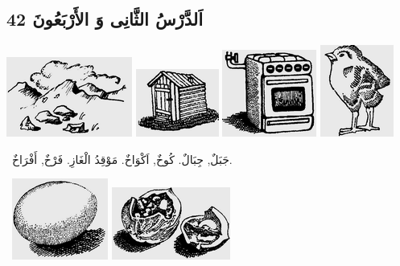 \documentclass[a5paper]{article}
\begin{document}
\subsection{اَلدَّرْسُ الثَّانِى وَ الأَرْبَعُونَ 42}
 \includegraphics[width=1.6252in,height=1.0311in]{images/MuhammadBagauddinprettified-img125.png}   \includegraphics[width=1.0728in,height=0.8752in]{images/MuhammadBagauddinprettified-img126.png}   \includegraphics[width=1.2189in,height=1.1252in]{images/MuhammadBagauddinprettified-img127.png}   \includegraphics[width=0.948in,height=1.1874in]{images/MuhammadBagauddinprettified-img128.png} 

\ جَبَلٌ, جِبَالٌ. كُوخٌ, اَكْوَاخٌ. مَوْقِدُ الْغَازِ. فَرْخٌ, أَفْرَاخٌ. 

\  \includegraphics[width=1.2398in,height=1.052in]{images/MuhammadBagauddinprettified-img129.png}   \includegraphics[width=1.5311in,height=0.9374in]{images/MuhammadBagauddinprettified-img130.png} 
\end{document}
